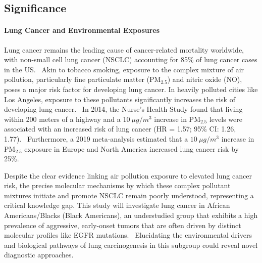 \subsection{Significance}





\paragraph{Lung Cancer and Environmental Exposures}
Lung cancer remains the leading cause of cancer-related mortality worldwide, with non-small cell lung cancer (NSCLC) 
accounting for 85\% of lung cancer cases in the US.~\cite{molina_nonsmall_2008} 
Akin to tobacco smoking, exposure to the complex mixture of air pollution, particularly fine particulate matter (PM$_{2.5}$) and nitric oxide (NO), 
poses a major risk factor for developing lung cancer. 
In heavily polluted cities like Los Angeles, exposure to these pollutants significantly increases the risk of developing lung cancer.~\cite{berg_air_2023,huang_air_2021} 
In 2014, the Nurse's Health Study found that living within 200 meters of a highway and a $10~\mu g/m^{3}$ increase in PM$_{2.5}$ 
levels were associated with an increased risk of lung cancer (HR = 1.57; 95\% CI: 1.26, 1.77).~\cite{puett_particulate_2014} 
Furthermore, a 2019 meta-analysis estimated that a $10~\mu g/m^{3}$ increase in PM$_{2.5}$ exposure in Europe and North America increased lung cancer risk by 25\%.~\cite{huang_ambient_2021}

Despite the clear evidence linking air pollution exposure to elevated lung cancer risk, 
the precise molecular mechanisms by which these complex pollutant mixtures initiate and promote NSCLC remain poorly understood, 
representing a critical knowledge gap. 
This study will investigate lung cancer in African Americans/Blacks (Black Americans), an understudied group that exhibits a high prevalence of aggressive, 
early-onset tumors that are often driven by distinct molecular profiles like EGFR mutations.~\cite{marcinkiewicz_impact_2023}
Elucidating the environmental drivers and biological pathways of lung carcinogenesis in this subgroup could reveal novel diagnostic approaches. 

